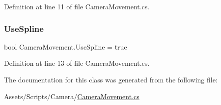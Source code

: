 Definition at line 11 of file Camera\+Movement.\+cs.

\mbox{\label{class_camera_movement_a0989aa3b78a8de043c986ad31df204d0}} 
\subsubsection{\texorpdfstring{Use\+Spline}{UseSpline}}
{\footnotesize\ttfamily bool Camera\+Movement.\+Use\+Spline = true}



Definition at line 13 of file Camera\+Movement.\+cs.



The documentation for this class was generated from the following file\+:\begin{DoxyCompactItemize}
\item 
Assets/\+Scripts/\+Camera/\mbox{\hyperlink{_camera_movement_8cs}{Camera\+Movement.\+cs}}\end{DoxyCompactItemize}
